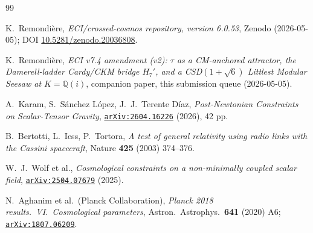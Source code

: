 \documentclass[aps,prl,twocolumn,showpacs,superscriptaddress]{revtex4-2}
\newcommand{\arXiv}[1]{\href{https://arxiv.org/abs/#1}{\texttt{arXiv:#1}}}
\newcommand{\Qi}{\mathbb{Q}(i)}
\begin{document}
\begin{thebibliography}{99}

K.~Remondi\`ere,
\emph{ECI/crossed-cosmos repository, version 6.0.53},
Zenodo (2026-05-05);
DOI \href{https://doi.org/10.5281/zenodo.20036808}{10.5281/zenodo.20036808}.

K.~Remondi\`ere,
\emph{ECI v7.4 amendment (v2): $\tau$ as a CM-anchored attractor,
the Damerell-ladder Cardy/CKM bridge $H_7'$, and a CSD$(1+\sqrt{6})$
Littlest Modular Seesaw at $K=\Qi$},
companion paper, this submission queue (2026-05-05).

A.~Karam, S.~S\'anchez L\'opez, J.~J.~Terente D\'iaz,
\emph{Post-Newtonian Constraints on Scalar-Tensor Gravity},
\arXiv{2604.16226} (2026), 42 pp.

B.~Bertotti, L.~Iess, P.~Tortora,
\emph{A test of general relativity using radio links with the Cassini
spacecraft},
Nature \textbf{425} (2003) 374--376.

W.~J.~Wolf et al.,
\emph{Cosmological constraints on a non-minimally coupled scalar field},
\arXiv{2504.07679} (2025).

N.~Aghanim et al.\ (Planck Collaboration),
\emph{Planck 2018 results.\ VI.\ Cosmological parameters},
Astron.~Astrophys.\ \textbf{641} (2020) A6;
\arXiv{1807.06209}.

\end{thebibliography}
\end{document}
